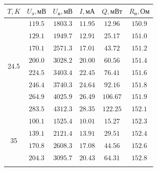 \documentclass[a4paper,12pt]{article}
\begin{document}
\begin{table}[H]
  \begin{center}
    \begin{tabular}{|c|c|c|c|c|c|}
      \hline $T, K$ & $U_\text{э}, \text{мВ}$ & $U_{\text{н}}, \text{мВ}$ & $I, \text{мА}$ & $Q, \text{мВт}$ & $R_{\text{н}}, \text{Ом}$ \\\hline
      \multirow{8}{*}{24.5}
                    & $119.5$                 & $1803.3$                  & $11.95$        & $12.96$         & $150.9$                   \\\cline{2-6}
                    & $129.1$                 & $1949.7$                  & $12.91$        & $25.17$         & $151.0$                   \\\cline{2-6}
                    & $170.1$                 & $2571.3$                  & $17.01$        & $43.72$         & $151.2$                   \\\cline{2-6}
                    & $200.0$                 & $3028.2$                  & $20.00$        & $60.56$         & $151.4$                   \\\cline{2-6}
                    & $224.5$                 & $3403.4$                  & $22.45$        & $76.41$         & $151.6$                   \\\cline{2-6}
                    & $246.4$                 & $3740.3$                  & $24.64$        & $92.16$         & $151.8$                   \\\cline{2-6}
                    & $264.9$                 & $4025.9$                  & $26.49$        & $106.67$        & $151.9$                   \\\cline{2-6}
                    & $283.5$                 & $4312.3$                  & $28.35$        & $122.25$        & $152.1$                   \\\hline
      \multirow{8}{*}{35}
                    & $100.1$                 & $1525.4$                  & $10.01$        & $15.27$         & $152.3$                   \\\cline{2-6}
                    & $139.1$                 & $2121.4$                  & $13.91$        & $29.51$         & $152.4$                   \\\cline{2-6}
                    & $170.8$                 & $2608.3$                  & $17.08$        & $44.56$         & $152.6$                   \\\cline{2-6}
                    & $204.3$                 & $3095.7$                  & $20.43$        & $64.31$         & $152.8$                   \\\cline{2-6}

\end{tabular}
\end{center}
\end{table}
\end{document}
